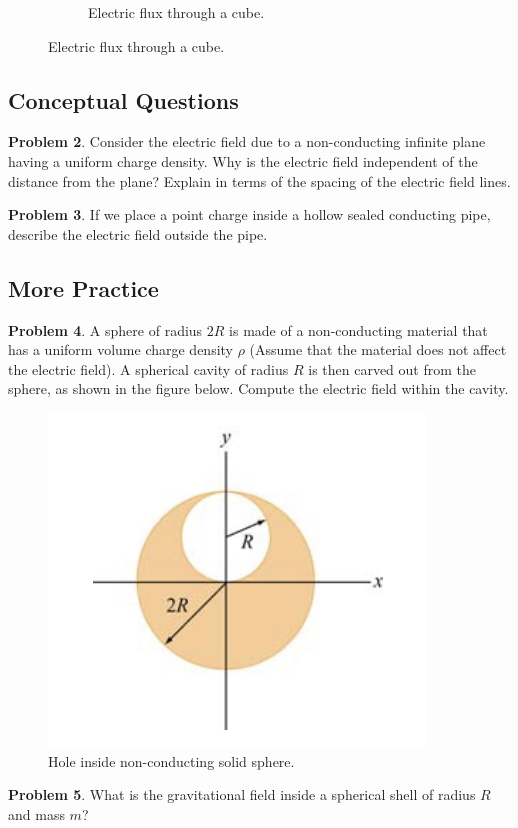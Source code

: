\documentclass[11pt, letterpaper]{article}
\begin{document}
\begin{figure}[h!]
\begin{subfigure}[b]{0.3\textwidth}
			\caption{Electric flux through a cube.}
		\end{subfigure}
	\end{figure}
	
	\subsection{Conceptual Questions}
	\textbf{Problem 2}. Consider the electric field due to a non-conducting infinite plane having a 
	uniform charge density. Why is the electric field independent of the distance from the plane?
	Explain in terms of the spacing of the electric field lines.
	
	\textbf{Problem 3}. If we place a point charge inside a hollow sealed conducting pipe, describe 
	the electric field outside the pipe.
	
	\subsection{More Practice}
	\textbf{Problem 4}. A sphere of radius $2R$ is made of a non-conducting material that has a
	uniform volume charge density $\rho$ (Assume that the material does not affect the electric
	field). A spherical cavity of radius $R$ is then carved out from the sphere, as shown in the figure
    below. Compute the electric field within the cavity.
    \begin{figure}[h!]
    		\centering
    		\includegraphics[scale=1]{hollow}
    		\caption{Hole inside non-conducting solid sphere.}
    \end{figure}
    
	\textbf{Problem 5}. What is the gravitational field inside a spherical shell of radius $R$ and mass
	$m$?
	
	
	
	
	
	
\end{document}
